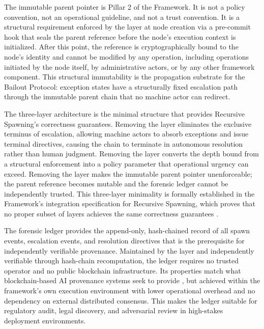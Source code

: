 The immutable parent pointer is Pillar 2 of the \bxthree{} Framework.  It is not a policy convention, not an operational guideline, and not a trust convention.  It is a structural requirement enforced by the \fact{} layer at node creation via a pre-commit hook that seals the parent reference before the node's execution context is initialized.  After this point, the reference is cryptographically bound to the node's identity and cannot be modified by any operation, including operations initiated by the node itself, by administrative actors, or by any other framework component.  This structural immutability is the propagation substrate for the Bailout Protocol: exception states have a structurally fixed escalation path through the immutable parent chain that no machine actor can redirect.

The three-layer architecture is the minimal structure that provides Recursive Spawning's correctness guarantees.  Removing the \purpose{} layer eliminates the exclusive terminus of escalation, allowing machine actors to absorb exceptions and issue terminal directives, causing the chain to terminate in autonomous resolution rather than human judgment.  Removing the \bounds{} layer converts the depth bound from a structural enforcement into a policy parameter that operational urgency can exceed.  Removing the \fact{} layer makes the immutable parent pointer unenforceable; the parent reference becomes mutable and the forensic ledger cannot be independently trusted.  This three-layer minimality is formally established in the \bxthree{} Framework's integration specification for Recursive Spawning, which proves that no proper subset of layers achieves the same correctness guarantees \cite{bx3framework}.

The \bxthree{} forensic ledger provides the append-only, hash-chained record of all spawn events, escalation events, and resolution directives that is the prerequisite for independently verifiable provenance.  Maintained by the \fact{} layer and independently verifiable through hash-chain recomputation, the ledger requires no trusted operator and no public blockchain infrastructure.  Its properties match what blockchain-based AI provenance systems seek to provide \cite{on_chain_provenance_ai}, but achieved within the framework's own execution environment with lower operational overhead and no dependency on external distributed consensus.  This makes the ledger suitable for regulatory audit, legal discovery, and adversarial review in high-stakes deployment environments.
